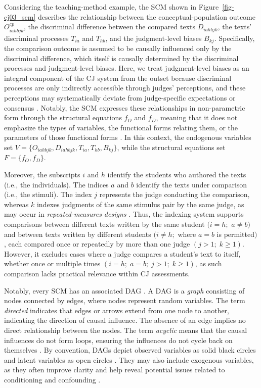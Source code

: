 \documentclass[
  authoryear,
  review,
  1p]{elsarticle}
\begin{document}
Considering the teaching-method example, the SCM shown in
Figure~\ref{fig-cj03_scm} describes the relationship between the
conceptual-population outcome \(O^{cp}_{iahbjk}\), the discriminal
difference between the compared texts \(D_{iahbjk}\), the texts'
discriminal processes \(T_{ia}\) and \(T_{hb}\), and the judgment-level
biases \(B_{kj}\). Specifically, the comparison outcome is assumed to be
causally influenced only by the discriminal difference, which itself is
causally determined by the discriminal processes and judgment-level
biases. Here, we treat judgment-level biases as an integral component of
the CJ system from the outset because discriminal processes are only
indirectly accessible through judges' perceptions, and these perceptions
may systematically deviate from judge-specific expectations or consensus
\citep[see,][]{Pollitt_et_al_2003, vanDaal_et_al_2016}. Notably, the SCM
expresses these relationships in non-parametric form through the
structural equations \(f_{O}\) and \(f_{D}\), meaning that it does not
emphasize the types of variables, the functional forms relating them, or
the parameters of those functional forms \citep{Pearl_et_al_2016}. In
this context, the endogenous variables set
\(V = \{ O_{iahbjk}, D_{iahbjk}, T_{ia}, T_{hb}, B_{kj} \}\), while the
structural equations set \(F = \{ f_{O}, f_{D} \}.\)

Moreover, the subscripts \(i\) and \(h\) identify the students who
authored the texts (i.e., the individuals). The indices \(a\) and \(b\)
identify the texts under comparison (i.e., the stimuli). The index \(j\)
represents the judge conducting the comparison, whereas \(k\) indexes
judgments of the same stimulus pair by the same judge, as may occur in
\emph{repeated-measures designs} \citep{Lawson_2015}. Thus, the indexing
system supports comparisons between different texts written by the same
student \((i = h;\) \(a \neq b)\) and between texts written by different
students \((i \neq h;\) where \(a = b\) is permitted\()\), each compared
once or repeatedly by more than one judge \((j >1; \; k \geq 1)\).
However, it excludes cases where a judge compares a student's text to
itself, whether once or multiple times
\((i = h; \; a = b; \; j >1; \; k \geq 1)\), as such comparison lacks
practical relevance within CJ assessments.

Notably, every SCM has an associated DAG
\citep{Pearl_et_al_2016, Cinelli_et_al_2020}. A DAG is a \emph{graph}
consisting of nodes connected by edges, where nodes represent random
variables. The term \emph{directed} indicates that edges or arrows
extend from one node to another, indicating the direction of causal
influence. The absence of an edge implies no direct relationship between
the nodes. The term \emph{acyclic} means that the causal influences do
not form loops, ensuring the influences do not cycle back on themselves
\citep{McElreath_2020}. By convention, DAGs depict observed variables as
solid black circles and latent variables as open circles
\citep{Morgan_et_al_2014}. They may also include exogenous variables, as
they often improve clarity and help reveal potential issues related to
conditioning and confounding \citep{Cinelli_et_al_2020}.
\end{document}
